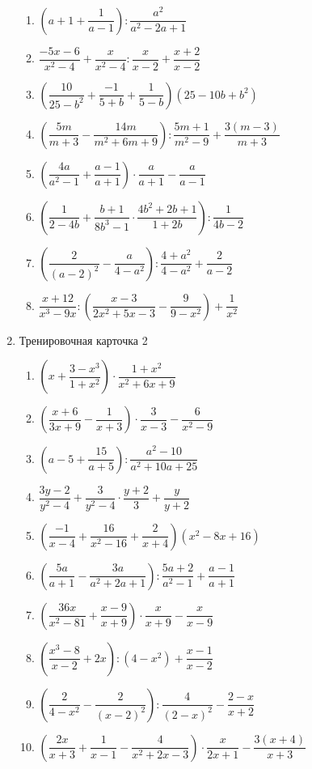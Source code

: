 \documentclass[12pt, a4paper]{article}
\begin{document}
\begin{enumerate}
\begin{enumerate}[label=\asbuk*)]
 					\item \(\left( a+1+\dfrac{1}{a-1} \right):\dfrac{a^2}{a^2-2a+1}\)
 					\item \(\dfrac{-5x-6}{x^2-4}+\dfrac{x}{x^2-4}:\dfrac{x}{x-2}+\dfrac{x+2}{x-2}\)
 					\item \(\left( \dfrac{10}{25-b^2}+\dfrac{-1}{5+b}+\dfrac{1}{5-b} \right)(25-10b+b^2)\)
 					\item \(\left( \dfrac{5m}{m+3}-\dfrac{14m}{m^2+6m+9} \right):\dfrac{5m+1}{m^2-9}+\dfrac{3(m-3)}{m+3}\)
 					\item \(\left( \dfrac{4a}{a^2-1}+\dfrac{a-1}{a+1} \right)\cdot\dfrac{a}{a+1}-\dfrac{a}{a-1}\)
 					\item \(\left( \dfrac{1}{2-4b} +\dfrac{b+1}{8b^3-1}\cdot\dfrac{4b^2+2b+1}{1+2b}\right):\dfrac{1}{4b-2}\)
 					\item \(\left( \dfrac{2}{(a-2)^2} -\dfrac{a}{4-a^2}\right):\dfrac{4+a^2}{4-a^2}+\dfrac{2}{a-2}\)
 					\item \(\dfrac{x+12}{x^3-9x}:\left( \dfrac{x-3}{2x^2+5x-3} -\dfrac{9}{9-x^2}\right)+\dfrac{1}{x^2}\)
 				\end{enumerate}
 			\item Тренировочная карточка 2
 			\begin{enumerate}[label=\asbuk*)]
 				\item \(\left( x+\dfrac{3-x^3}{1+x^2} \right)\cdot\dfrac{1+x^2}{x^2+6x+9}\)
 				\item \(\left( \dfrac{x+6}{3x+9}-\dfrac{1}{x+3} \right)\cdot\dfrac{3}{x-3}-\dfrac{6}{x^2-9}\)
 				\item \(\left( a-5+\dfrac{15}{a+5} \right):\dfrac{a^2-10}{a^2+10a+25}\)
 				\item \(\dfrac{3y-2}{y^2-4}+\dfrac{3}{y^2-4}\cdot\dfrac{y+2}{3}+\dfrac{y}{y+2}\)
 				\item \(\left( \dfrac{-1}{x-4}+\dfrac{16}{x^2-16}+\dfrac{2}{x+4} \right)(x^2-8x+16)\)
 				\item \(\left( \dfrac{5a}{a+1}-\dfrac{3a}{a^2+2a+1} \right):\dfrac{5a+2}{a^2-1}+\dfrac{a-1}{a+1}\)
 				\item \(\left( \dfrac{36x}{x^2-81}+\dfrac{x-9}{x+9} \right)\cdot\dfrac{x}{x+9}-\dfrac{x}{x-9}\)
 				\item \(\left( \dfrac{x^3-8}{x-2}+2x \right):(4-x^2)+\dfrac{x-1}{x-2}\)
 				\item \(\left( \dfrac{2}{4-x^2}-\dfrac{2}{(x-2)^2} \right):\dfrac{4}{(2-x)^2}-\dfrac{2-x}{x+2}\)
 				\item \(\left( \dfrac{2x}{x+3}+\dfrac{1}{x-1}-\dfrac{4}{x^2+2x-3} \right)\cdot\dfrac{x}{2x+1}-\dfrac{3(x+4)}{x+3}\)

\end{enumerate}
\end{enumerate}
\end{document}
